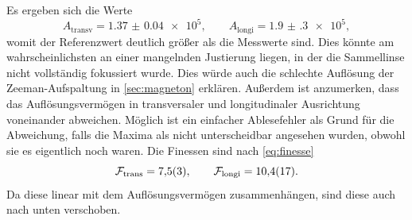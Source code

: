 Es ergeben sich die Werte 
\[A_\mathrm{transv} = \num{1.37(4)e5}, \qquad A_\mathrm{longi} = \num{1.9(3)e5},\]
womit der Referenzwert deutlich größer als die Messwerte sind. Dies könnte am wahrscheinlichsten 
an einer mangelnden Justierung liegen, in der die Sammellinse nicht vollständig fokussiert 
wurde. Dies würde auch die schlechte Auflösung der Zeeman-Aufspaltung in \cref{sec:magneton} 
erklären. Außerdem ist anzumerken, dass das Auflösungsvermögen in transversaler und longitudinaler Ausrichtung 
voneinander abweichen. Möglich ist ein einfacher 
Ablesefehler als Grund für die Abweichung, falls die Maxima als nicht unterscheidbar 
angesehen wurden, obwohl sie es eigentlich noch waren.
Die Finessen sind nach \cref{eq:finesse}
\[\mathcal F_\mathrm{trans} = \num{7.5\pm.3},\qquad \mathcal F_\mathrm{longi} = \num{10.4\pm1.7}.\]
Da diese linear mit dem Auflösungsvermögen zusammenhängen, sind diese auch nach unten 
verschoben.


